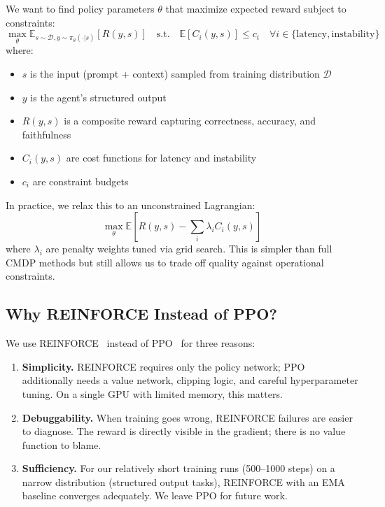 \documentclass[11pt]{article}
\begin{document}
We want to find policy parameters $\theta$ that maximize expected reward subject to constraints:
\begin{equation}
\max_{\theta} \mathbb{E}_{s \sim \mathcal{D}, y \sim \pi_\theta(\cdot|s)} [R(y, s)]
\quad \text{s.t.} \quad
\mathbb{E}[C_i(y, s)] \leq c_i \quad \forall i \in \{\text{latency}, \text{instability}\}
\end{equation}
where:
\begin{itemize}[leftmargin=12pt]
    \item $s$ is the input (prompt + context) sampled from training distribution $\mathcal{D}$
    \item $y$ is the agent's structured output
    \item $R(y, s)$ is a composite reward capturing correctness, accuracy, and faithfulness
    \item $C_i(y, s)$ are cost functions for latency and instability
    \item $c_i$ are constraint budgets
\end{itemize}

In practice, we relax this to an unconstrained Lagrangian:
\begin{equation}
\max_{\theta} \mathbb{E} \left[ R(y, s) - \sum_i \lambda_i C_i(y, s) \right]
\end{equation}
where $\lambda_i$ are penalty weights tuned via grid search.
This is simpler than full CMDP methods but still allows us to trade off quality against operational constraints.

\subsection{Why REINFORCE Instead of PPO?}

We use REINFORCE~\citep{williams1992reinforce} instead of PPO~\citep{schulman2017ppo} for three reasons:

\begin{enumerate}[leftmargin=12pt]
    \item \textbf{Simplicity.} REINFORCE requires only the policy network; PPO additionally needs a value network, clipping logic, and careful hyperparameter tuning. On a single GPU with limited memory, this matters.

    \item \textbf{Debuggability.} When training goes wrong, REINFORCE failures are easier to diagnose. The reward is directly visible in the gradient; there is no value function to blame.

    \item \textbf{Sufficiency.} For our relatively short training runs (500--1000 steps) on a narrow distribution (structured output tasks), REINFORCE with an EMA baseline converges adequately. We leave PPO for future work.
\end{enumerate}
\end{document}
